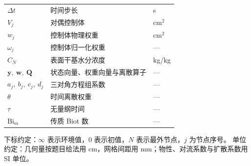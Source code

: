 \begin{longtable}{@{}l p{7.4cm} l@{}}
  $\Delta t$ & 时间步长 & s \\
  $V_j$ & 对偶控制体 & cm$^2$ \\
  $w_j$ & 控制体物理权重 & cm$^2$ \\
  $\omega_j$ & 控制体归一化权重 & --- \\
  $C_N$ & 表面干基水分浓度 & kg/kg \\
  $\mathbf{y},\ \mathbf{w},\ \mathbf{Q}$ & 状态向量、权重向量与离散算子 & --- \\
  $a_j,\ b_j,\ c_j,\ d_j$ & 三对角方程组系数 & --- \\
  $\theta$ & 时间离散权重 & --- \\
  \addlinespace[3pt]
  $\tau$ & 无量纲时间 & --- \\
  $\text{Bi}_m$ & 传质 Biot 数 & --- \\
\end{longtable}
\renewcommand{\arraystretch}{1.0}

下标约定：$\infty$ 表示环境值，$0$ 表示初值，$N$ 表示最外节点，$j$ 为节点序号。
单位约定：几何量按题目给法用 cm，网格间距用 mm；物性、对流系数与扩散系数用 SI 单位。
